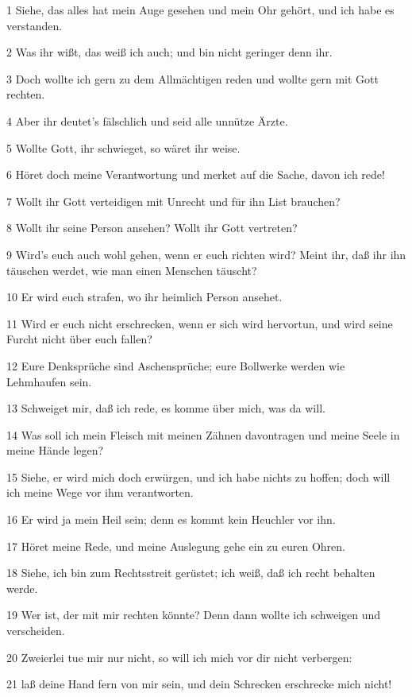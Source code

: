 \par 1 Siehe, das alles hat mein Auge gesehen und mein Ohr gehört, und ich habe es verstanden.
\par 2 Was ihr wißt, das weiß ich auch; und bin nicht geringer denn ihr.
\par 3 Doch wollte ich gern zu dem Allmächtigen reden und wollte gern mit Gott rechten.
\par 4 Aber ihr deutet's fälschlich und seid alle unnütze Ärzte.
\par 5 Wollte Gott, ihr schwieget, so wäret ihr weise.
\par 6 Höret doch meine Verantwortung und merket auf die Sache, davon ich rede!
\par 7 Wollt ihr Gott verteidigen mit Unrecht und für ihn List brauchen?
\par 8 Wollt ihr seine Person ansehen? Wollt ihr Gott vertreten?
\par 9 Wird's euch auch wohl gehen, wenn er euch richten wird? Meint ihr, daß ihr ihn täuschen werdet, wie man einen Menschen täuscht?
\par 10 Er wird euch strafen, wo ihr heimlich Person ansehet.
\par 11 Wird er euch nicht erschrecken, wenn er sich wird hervortun, und wird seine Furcht nicht über euch fallen?
\par 12 Eure Denksprüche sind Aschensprüche; eure Bollwerke werden wie Lehmhaufen sein.
\par 13 Schweiget mir, daß ich rede, es komme über mich, was da will.
\par 14 Was soll ich mein Fleisch mit meinen Zähnen davontragen und meine Seele in meine Hände legen?
\par 15 Siehe, er wird mich doch erwürgen, und ich habe nichts zu hoffen; doch will ich meine Wege vor ihm verantworten.
\par 16 Er wird ja mein Heil sein; denn es kommt kein Heuchler vor ihn.
\par 17 Höret meine Rede, und meine Auslegung gehe ein zu euren Ohren.
\par 18 Siehe, ich bin zum Rechtsstreit gerüstet; ich weiß, daß ich recht behalten werde.
\par 19 Wer ist, der mit mir rechten könnte? Denn dann wollte ich schweigen und verscheiden.
\par 20 Zweierlei tue mir nur nicht, so will ich mich vor dir nicht verbergen:
\par 21 laß deine Hand fern von mir sein, und dein Schrecken erschrecke mich nicht!
